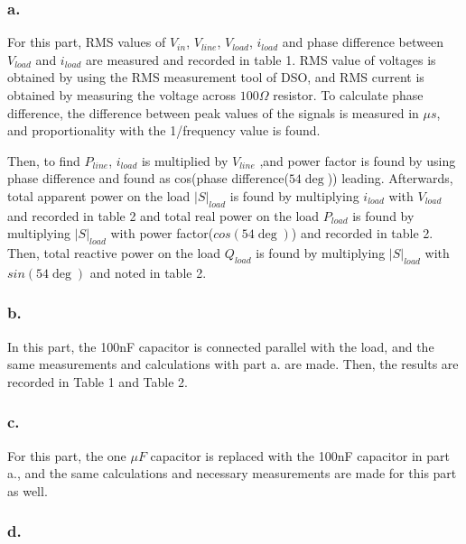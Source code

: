 \documentclass[letterpaper,12pt]{article}
\begin{document}
\subsubsection{a.}
For this part, RMS values of \(V_{in}\), \(V_{line}\), \(V_{load}\), \(i_{load}\) and phase difference between \(V_{load}\) and \(i_{load}\) are measured and recorded in table 1. RMS value of voltages is obtained by using the RMS measurement tool of DSO, and RMS current is obtained by measuring the voltage across \(100\Omega\) resistor. To calculate phase difference, the difference between peak values of the signals is measured in \(\mu s\), and proportionality with the 1/frequency value is found.


Then, to find \(P_{line}\), \(i_{load}\) is multiplied by \(V_{line}\) ,and power factor is found by using phase difference and found as cos(phase difference(\(54\deg \))) leading. Afterwards, total apparent power on the load \(|S|_{load}\) is found by multiplying \(i_{load}\) with \(V_{load}\) and recorded in table 2 and total real power on the load \(P_{load}\) is found by multiplying \(|S|_{load}\) with power factor(\(cos(54\deg )\)) and recorded in table 2. Then, total reactive power on the load \(Q_{load}\) is found by multiplying \(|S|_{load}\) with \(sin(54\deg )\) and noted in table 2.
\subsubsection{b.}
In this part, the 100nF capacitor is connected parallel with the load, and the same measurements and calculations with part a. are made. Then, the results are recorded in Table 1 and Table 2.   
\subsubsection{c.}
For this part, the one \(\mu F\) capacitor is replaced with the 100nF capacitor in part a., and the same calculations and necessary measurements are made for this part as well.
\subsubsection{d.}
\end{document}
